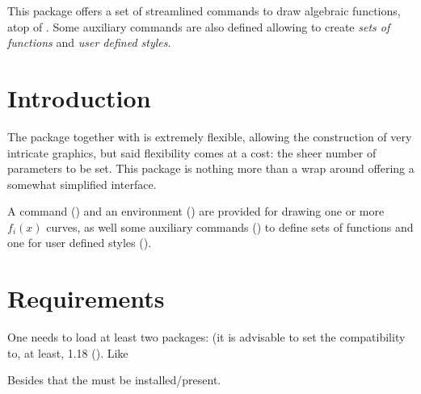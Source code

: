 \documentclass[10pt]{article}
\begin{document}


\begin{typesetabstract}


This package offers a set of streamlined commands to draw algebraic functions, atop of . Some auxiliary commands are also defined allowing to create \emph{sets of functions} and \emph{user defined styles}.
\end{typesetabstract}

\tableofcontents

\section{Introduction}

The \cite{PGFPLOTS:1.18} package together with \cite{gnuplot:5.4} is extremely flexible, allowing the construction of very intricate graphics, but said flexibility comes at a cost: the sheer number of parameters to be set.
This package is nothing more than a wrap around  offering a somewhat simplified interface.

A command (\tsobj{\fxgraphdraw}) and an environment () are provided for drawing one or more $f_i(x)$ curves, as well some auxiliary commands (\tsobj{\fxsetnew,\fxsetappend}) to define sets of functions and one for user defined styles (\tsobj{\fxsetnewstyle}).


\section{Requirements}

One needs to load at least two packages:  (it is advisable to set the  compatibility to, at least, 1.18 (\tsverb{\pgfplotsset{compat=1.18}}). Like
\begin{codestore}
\usepackage{tikz}
\usepackage{pgfplots}
\pgfplotsset{compat=1.18}

\usetikzlibrary{pgfplots.units} %
\end{codestore}


Besides that the  must be installed/present.
\end{document}

